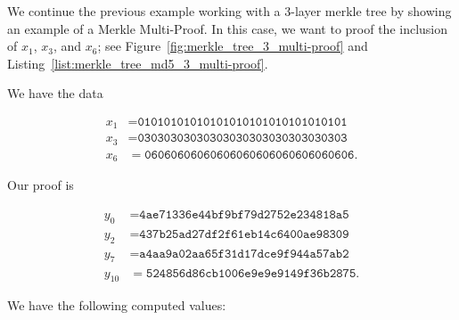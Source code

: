 \begin{example}
\label{example:hash_app_merkle_tree_multi-proof}

We continue the previous example working with a 3-layer \gls{merkle tree}
by showing an example of a Merkle Multi-Proof.
In this case, we want to proof the inclusion of
$x_{1}$, $x_{3}$, and $x_{6}$;
see Figure~\ref{fig:merkle_tree_3_multi-proof}
and Listing~\ref{list:merkle_tree_md5_3_multi-proof}.




We have the data

\begin{align}
    x_{1} &= \texttt{01010101010101010101010101010101}
        \nonumber\\
    x_{3} &= \texttt{03030303030303030303030303030303}
        \nonumber\\
    x_{6} &= \texttt{06060606060606060606060606060606}.
\end{align}

\noindent
Our proof is

\begin{align}
    y_{0}  &= \texttt{4ae71336e44bf9bf79d2752e234818a5}
        \nonumber\\
    y_{2}  &= \texttt{437b25ad27df2f61eb14c6400ae98309}
        \nonumber\\
    y_{7}  &= \texttt{a4aa9a02aa65f31d17dce9f944a57ab2}
        \nonumber\\
    y_{10} &= \texttt{524856d86cb1006e9e9e9149f36b2875}.
\end{align}

\noindent
We have the following computed values:


\end{example}
